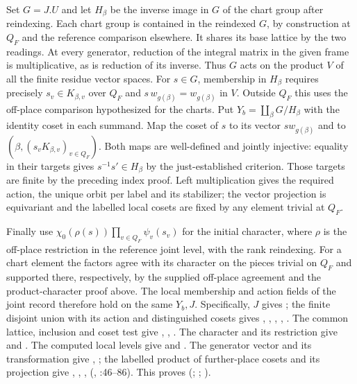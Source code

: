 Set $G=J.U$ and let $H_\beta$ be the inverse image in $G$ of the
chart group after reindexing. Each chart group is contained in the
reindexed $G$, by construction at $Q_F$ and the reference comparison
elsewhere. It shares its base lattice by the two readings. At every
generator, reduction of the integral matrix in the given frame
is multiplicative, as is reduction of its inverse. Thus $G$ acts on
the product $V$ of all the finite residue vector spaces.
For $s\in G$, membership in $H_\beta$ requires precisely
$s_v\in K_{\beta,v}$ over $Q_F$ and
$s\,w_{g(\beta)}=w_{g(\beta)}$ in $V$. Outside $Q_F$ this uses the
off-place comparison hypothesized for the charts. Put
$Y_b=\coprod_\beta G/H_\beta$ with the identity coset in each
summand. Map the coset of $s$ to its vector $s w_{g(\beta)}$ and to
$(\beta,(s_vK_{\beta,v})_{v\in Q_F})$. Both maps are well-defined and
jointly injective: equality in their targets gives
$s^{-1}s'\in H_\beta$ by the just-established criterion. Those targets
are finite by the preceding index proof. Left multiplication gives
the required action, the unique orbit per label and its stabilizer;
the vector projection is equivariant and the labelled local cosets
are fixed by any element trivial at $Q_F$.

Finally use $\chi_0(\rho(s))\prod_{v\in Q_F}\psi_v(s_v)$ for the
initial character, where $\rho$ is the off-place restriction in the
reference joint level, with the rank reindexing. For a chart element
the factors agree with its character on the pieces trivial on
$Q_F$ and supported there, respectively, by the supplied off-place
agreement and the product-character proof above. The local
membership and action fields of the joint record therefore hold
on the same $Y_b,J$. Specifically, $J$ gives ;
the finite disjoint union with its action and distinguished cosets gives
, , , , .
The common lattice, inclusion and coset test give , ,
. The character and its restriction give  and
. The computed local levels give  and
. The generator vector and its transformation give
, ; the labelled product of further-place
cosets and its projection give , , ,
 (, :46--86).
This proves
(;
;
).

